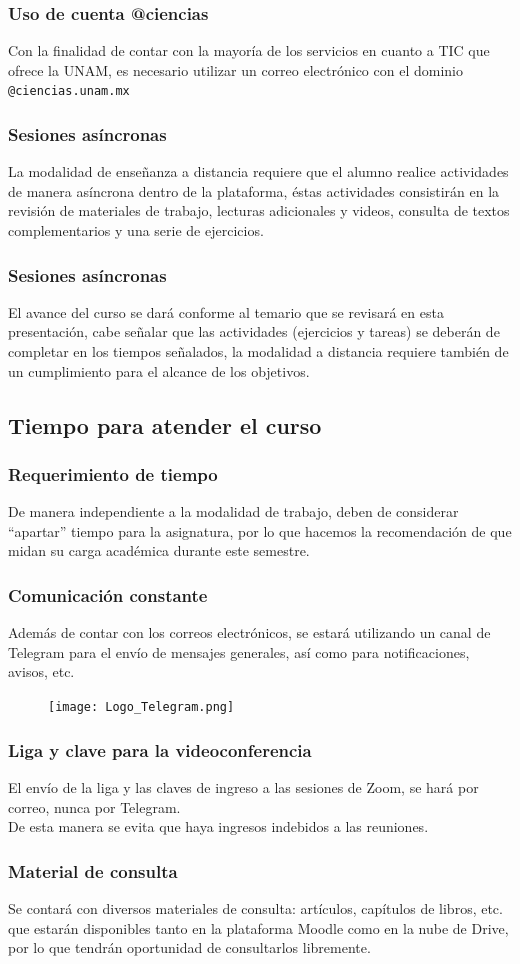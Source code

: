 \begin{frame}
\frametitle{Uso de cuenta @ciencias}
Con la finalidad de contar con la mayoría de los servicios en cuanto a TIC que ofrece la UNAM, es necesario utilizar un correo electrónico con el dominio \texttt{@ciencias.unam.mx}
\end{frame}
\begin{frame}
\frametitle{Sesiones asíncronas}
La modalidad de enseñanza a distancia requiere que el alumno realice actividades de manera asíncrona dentro de la plataforma, éstas actividades consistirán en la revisión de materiales de trabajo, lecturas adicionales y videos, consulta de textos complementarios y una serie de ejercicios.
\end{frame}
\begin{frame}
\frametitle{Sesiones asíncronas}
El avance del curso se dará conforme al temario que se revisará en esta presentación, cabe señalar que las actividades (ejercicios y tareas) se deberán de completar en los tiempos señalados, la modalidad a distancia requiere también de un cumplimiento para el alcance de los objetivos.
\end{frame}
{

}
\subsection{Tiempo para atender el curso}
\begin{frame}
\frametitle{Requerimiento de tiempo}
De manera independiente a la modalidad de trabajo, deben de considerar \enquote{apartar} tiempo para la asignatura, por lo que hacemos la recomendación de que midan su carga académica durante este semestre.
\end{frame}
\begin{frame}
\frametitle{Comunicación constante}
Además de contar con los correos electrónicos, se estará utilizando un canal de Telegram para el envío de mensajes generales, así como para notificaciones, avisos, etc.
\\
\bigskip
\begin{figure}
    \centering
    \texttt{[image: Logo\_Telegram.png]}
\end{figure}
\end{frame}
\begin{frame}
\frametitle{Liga y clave para la videoconferencia}
El envío de la liga y las claves de ingreso a las sesiones de Zoom, se hará por correo, nunca por Telegram.
\\
\bigskip
De esta manera se evita que haya ingresos indebidos a las reuniones.
\end{frame}
\begin{frame}
\frametitle{Material de consulta}
Se contará con diversos materiales de consulta: artículos, capítulos de libros, etc. que estarán disponibles tanto en la plataforma Moodle como en la nube de Drive, por lo que tendrán oportunidad de consultarlos libremente.
\end{frame}

